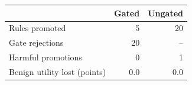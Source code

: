 \begin{tabular}{lrr}\toprule
& Gated & Ungated \\\midrule
Rules promoted & 5 & 20 \\
Gate rejections & 20 & -- \\
Harmful promotions & 0 & 1 \\
Benign utility lost (points) & 0.0 & 0.0 \\
\bottomrule\end{tabular}

